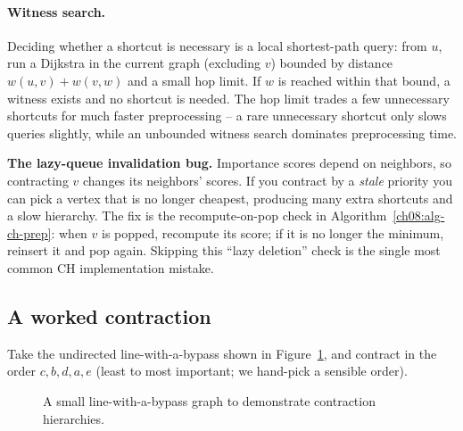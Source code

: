 \paragraph{Witness search.} Deciding whether a shortcut is necessary is a local
shortest-path query: from $u$, run a Dijkstra in the current graph (excluding
$v$) bounded by distance $w(u,v)+w(v,w)$ and a small hop limit. If $w$ is reached
within that bound, a witness exists and no shortcut is needed. The hop limit
trades a few unnecessary shortcuts for much faster preprocessing -- a rare
unnecessary shortcut only slows queries slightly, while an unbounded witness
search dominates preprocessing time.

\begin{trapbox}
\textbf{The lazy-queue invalidation bug.} Importance scores depend on neighbors,
so contracting $v$ changes its neighbors' scores. If you contract by a
\emph{stale} priority you can pick a vertex that is no longer cheapest, producing
many extra shortcuts and a slow hierarchy. The fix is the recompute-on-pop check
in Algorithm~\ref{ch08:alg-ch-prep}: when $v$ is popped, recompute its score; if
it is no longer the minimum, reinsert it and pop again. Skipping this ``lazy
deletion'' check is the single most common CH implementation mistake.
\end{trapbox}

\subsection{A worked contraction}
\label{ch08:ch-trace}

Take the undirected line-with-a-bypass shown in Figure~\ref{fig:ch08:ch-trace-graph}, and contract in the order
$c, b, d, a, e$ (least to most important; we hand-pick a sensible order).

\begin{figure}[htbp]
\centering
{}
\caption{A small line-with-a-bypass graph to demonstrate contraction hierarchies.}
\label{fig:ch08:ch-trace-graph}
\end{figure}

